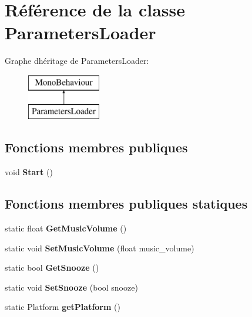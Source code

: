 \hypertarget{class_parameters_loader}{}\section{Référence de la classe Parameters\+Loader}
\label{class_parameters_loader}
Graphe d\textquotesingle{}héritage de Parameters\+Loader\+:\begin{figure}[H]
\begin{center}
\leavevmode
\includegraphics[height=2.000000cm]{class_parameters_loader}
\end{center}
\end{figure}
\subsection*{Fonctions membres publiques}
\begin{DoxyCompactItemize}
\item 
\mbox{\label{class_parameters_loader_a7150dc98b0bf3c29d6f0c2494314ab1f}} 
void {\bfseries Start} ()
\end{DoxyCompactItemize}
\subsection*{Fonctions membres publiques statiques}
\begin{DoxyCompactItemize}
\item 
\mbox{\label{class_parameters_loader_afeda242af9632639661957a7a46c8a1a}} 
static float {\bfseries Get\+Music\+Volume} ()
\item 
\mbox{\label{class_parameters_loader_ad4e278bf9cc9a5aed98032241fb0c6b8}} 
static void {\bfseries Set\+Music\+Volume} (float music\+\_\+volume)
\item 
\mbox{\label{class_parameters_loader_a55ed144c6b0b938358265b1e5072e5dd}} 
static bool {\bfseries Get\+Snooze} ()
\item 
\mbox{\label{class_parameters_loader_a28c8d880037a4ee6b54eae165f6c11cb}} 
static void {\bfseries Set\+Snooze} (bool snooze)
\item 
\mbox{\label{class_parameters_loader_ab01abf8b5b1f436c3aa4ca9b6a8a9a78}} 
static Platform {\bfseries get\+Platform} ()
\end{DoxyCompactItemize}
